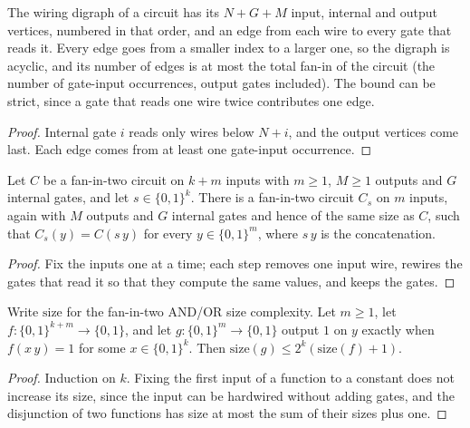 \begin{lemma}
  \label{lem:circuits-dependency-graph}
  \leanok
  The wiring digraph of a circuit has its $N + G + M$ input, internal and
  output vertices, numbered in that order, and an edge from each wire to every
  gate that reads it. Every edge goes from a smaller index to a larger one, so
  the digraph is acyclic, and its number of edges is at most the total fan-in
  of the circuit (the number of gate-input occurrences, output gates included).
  The bound can be strict, since a gate that reads one wire twice contributes
  one edge.
\end{lemma}
\begin{proof}
  \leanok
  Internal gate $i$ reads only wires below $N + i$, and the output vertices
  come last. Each edge comes from at least one gate-input occurrence.
\end{proof}

\begin{lemma}
  \label{lem:circuits-hardwiring}
  \leanok
  Let $C$ be a fan-in-two circuit on $k + m$ inputs with $m \ge 1$, $M \ge 1$
  outputs and $G$ internal gates, and let $s \in \{0,1\}^k$. There is a
  fan-in-two circuit $C_s$ on $m$ inputs, again with $M$ outputs and $G$
  internal gates and hence of the same size as $C$, such that $C_s(y) = C(s\,y)$
  for every $y \in \{0,1\}^m$, where $s\,y$ is the concatenation.
\end{lemma}
\begin{proof}
  \leanok
  Fix the inputs one at a time; each step removes one input wire, rewires the
  gates that read it so that they compute the same values, and keeps the
  gates.
\end{proof}

\begin{lemma}
  \label{lem:circuits-exists-quantify}
  \leanok
  Write $\mathrm{size}$ for the fan-in-two AND/OR size complexity. Let
  $m \ge 1$, let $f : \{0,1\}^{k + m} \to \{0,1\}$, and let
  $g : \{0,1\}^m \to \{0,1\}$ output $1$ on $y$ exactly when $f(x\,y) = 1$ for
  some $x \in \{0,1\}^k$. Then
  $\mathrm{size}(g) \le 2^k (\mathrm{size}(f) + 1)$.
\end{lemma}
\begin{proof}
  \leanok
  Induction on $k$. Fixing the first input of a function to a constant does
  not increase its size, since the input can be hardwired without adding
  gates, and the disjunction of two functions has size at most the sum of
  their sizes plus one.
\end{proof}

